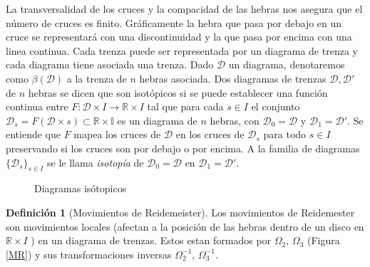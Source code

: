 \documentclass[12pt]{article}
\theoremstyle{definition}
\newtheorem{defi}{Definición}[section]
\begin{document}
La transversalidad de los cruces y la compacidad de las hebras nos asegura que el número de cruces es finito. Gráficamente la hebra que pasa por debajo en un cruce se representará con una discontinuidad y la que pasa por encima con una linea continua. Cada trenza puede ser representada por un diagrama de trenza y cada diagrama tiene asociada una trenza. Dado $\mathcal{D}$ un diagrama, denotaremos como $\beta(\mathcal{D})$ a la trenza de $n$ hebras asociada.
\newline
\newline
Dos diagramas de trenzas $\mathcal{D}, \mathcal{D}'$ de $n$ hebras se dicen que son isotópicos si se puede establecer una función continua entre $F:\mathcal{D}\times I\rightarrow\mathbb{R}\times I$ tal que para cada $s\in I$ el conjunto $\mathcal{D}_s = F(\mathcal{D}\times s)\subset\mathbb{R\times I}$ es un diagrama de $n$ hebras, con $\mathcal{D}_0 = \mathcal{D}$ y $\mathcal{D}_1 = \mathcal{D}'$. Se entiende que $F$ mapea los cruces de $\mathcal{D}$ en los cruces de $\mathcal{D}_s$ para todo $s\in I$ preservando si los cruces son por debajo o por encima. A la familia de diagramas $\{\mathcal{D}_s\}_{s\in I}$ se le llama \textit{isotopía} de $\mathcal{D}_0 = \mathcal{D}$ en $\mathcal{D}_1 = \mathcal{D}'$.




\begin{figure}[h!]
\centering
{}
\label{fig:d_iso}
\caption{Diagramas isótopicos}
\end{figure}







\begin{defi}[Movimientos de Reidemeister]  Los movimientos de Reidemester  son movimientos locales (afectan a la posición de las hebras dentro de un disco en 
$ \mathbb{R}\times I $ ) en un diagrama de trenzas. Estos estan formados por $\Omega_2$, $\Omega_3$ (Figura \ref{MR}) y sus transformaciones inversas
$\Omega_2^{-1}$, $\Omega_3^{-1}$. 

\end{defi}
\end{document}
